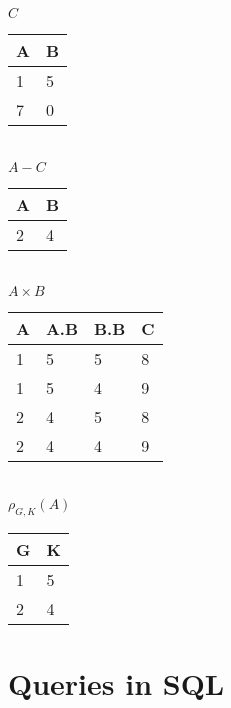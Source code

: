 \documentclass[12pt, a4paper]{article}
\begin{document}
			\begin{minipage}[t]{0.32\textwidth}
				\begin{center}
				$C$\\
				\begin{tabular}{|l|l|}
				\hline
				A & B \\ \hline
				1 & 5 \\ \hline
				7 & 0 \\ \hline
				\end{tabular}\\[4mm]
				$A- C$\\
				\begin{tabular}{|l|l|}
				\hline
				A & B \\ \hline
				2 & 4 \\ \hline
				\end{tabular}\\[4mm]
				$A\times B$\\
				\begin{tabular}{|l|l|l|l|}
				\hline
				A & A.B & B.B & C \\ \hline
				1 & 5 & 5 & 8\\ \hline
				1 & 5 & 4 & 9\\ \hline
				2 & 4 & 5 & 8\\ \hline
				2 & 4 & 4 & 9\\ \hline
				\end{tabular}\\[4mm]
				$\rho_{G,K}(A)$\\
				\begin{tabular}{|l|l|}
				\hline
				G & K \\ \hline
				1 & 5 \\ \hline
				2 & 4 \\ \hline
				\end{tabular}
				\end{center}				
			\end{minipage}
	\section{Queries in SQL}
\end{document}

